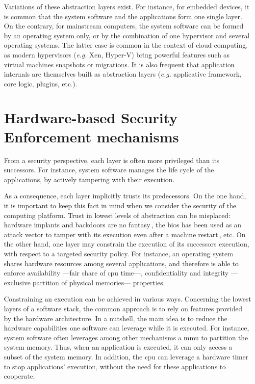 Variations of these abstraction layers exist.
%
For instance, for embedded devices, it is common that the system software and
the applications form one single layer.
%
On the contrary, for mainstream computers, the system software can be formed by
an operating system only, or by the combination of one hypervisor and several
operating systems.
%
The latter case is common in the context of cloud computing, as modern
hypervisors (\emph{e.g.} Xen, Hyper-V) bring powerful features such as virtual
machines snapshots or migrations. 
%
It is also frequent that application internals are themselves built as
abstraction layers (\emph{e.g.} applicative framework, core logic, plugins,
etc.).


\section{Hardware-based Security Enforcement mechanisms}

From a security perspective, each layer is often more privileged than its
successors.
%
For instance, system software manages the life cycle of the applications, by
actively tampering with their execution.

As a consequence, each layer implicitly trusts its predecessors.
%
On the one hand, it is important to keep this fact in mind when we consider the
security of the computing platform.
%
Trust in lowest levels of abstraction can be misplaced: hardware implants and
backdoors are no fantasy\,\cite{yang2016a2}, the \ac{bios} has been used as an
attack vector to tamper with its execution even after a machine
restart\,\cite{embleton2013smm}, etc.
%
On the other hand, one layer may constrain the execution of its successors
execution, with respect to a targeted security policy.
%
For instance, an operating system shares hardware resources among several
applications, and therefore is able to enforce availability ---fair share of
\ac{cpu} time---, confidentiality and integrity ---exclusive partition of
physical memories--- properties.

Constraining an execution can be achieved in various ways.
%
Concerning the lowest layers of a software stack, the common approach is to rely
on features provided by the hardware architecture.
%
In a nutshell, the main idea is to reduce the hardware capabilities one software
can leverage while it is executed.
%
For instance, system software often leverages among other mechanisms a \ac{mmu}
to partition the system memory.
%
Thus, when an application is executed, it can only access a subset of the system
memory.
%
In addition, the \ac{cpu} can leverage a hardware timer to stop applications'
execution, without the need for these applications to cooperate.

